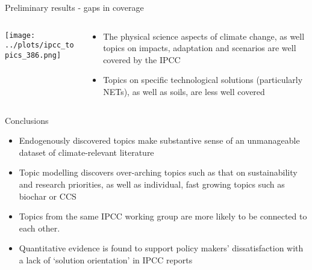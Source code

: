 \documentclass[9pt]{beamer}
\begin{document}
\begin{frame}{Preliminary results - gaps in coverage}

\begin{columns}
	\begin{column}{0.7\linewidth}
		\begin{center}
			\texttt{[image: ../plots/ipcc\_topics\_386.png]}
		\end{center}
	\end{column}
	\begin{column}{0.3\linewidth}
		\begin{center}
			\begin{itemize}
				\item The physical science aspects of climate change, as well topics on impacts, adaptation and scenarios are well covered by the IPCC
				\item Topics on specific technological solutions (particularly NETs), as well as soils, are less well covered
			\end{itemize}
		\end{center}
	\end{column}
\end{columns}

\end{frame}

\begin{frame}{Conclusions}


\begin{itemize}
	\item Endogenously discovered topics make substantive sense of an unmanageable dataset of climate-relevant literature
	\item Topic modelling discovers over-arching topics such as that on sustainability and research priorities, as well as individual, fast growing topics such as biochar or CCS
	\item Topics from the same IPCC working group are more likely to be connected to each other.
	\item Quantitative evidence is found to support policy makers' dissatisfaction with a lack of `solution orientation' in IPCC reports \citep{Kowarsch2017} 
\end{itemize}

\end{frame}
\end{document}
